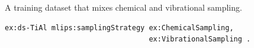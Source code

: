 A training dataset that mixes chemical and vibrational sampling.
\begin{lstlisting}[language=turtle]
ex:ds-TiAl mlips:samplingStrategy ex:ChemicalSampling,
                                  ex:VibrationalSampling .
\end{lstlisting}
